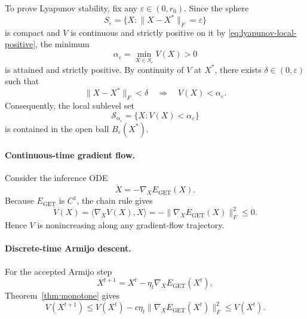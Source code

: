 \documentclass[11pt,a4paper]{article}
\begin{document}
To prove Lyapunov stability, fix any $\varepsilon\in(0,r_0)$. Since the
sphere
\begin{equation}
  S_\varepsilon = \{X : \|X-X^*\|_F = \varepsilon\}
\end{equation}
is compact and $V$ is continuous and strictly positive on it by
\eqref{eq:lyapunov-local-positive}, the minimum
\begin{equation}
  \alpha_\varepsilon
  = \min_{X\in S_\varepsilon} V(X)
  > 0
  \label{eq:lyapunov-alpha}
\end{equation}
is attained and strictly positive. By continuity of $V$ at $X^*$, there
exists $\delta\in(0,\varepsilon)$ such that
\begin{equation}
  \|X-X^*\|_F < \delta
  \quad\Longrightarrow\quad
  V(X) < \alpha_\varepsilon.
  \label{eq:lyapunov-delta}
\end{equation}
Consequently, the local sublevel set
\begin{equation}
  \mathcal{S}_{\alpha_\varepsilon}
  = \{X : V(X) < \alpha_\varepsilon\}
  \label{eq:lyapunov-sublevel}
\end{equation}
is contained in the open ball $B_\varepsilon(X^*)$.

\paragraph{Continuous-time gradient flow.}
Consider the inference ODE
\begin{equation}
  \dot X = -\nabla_X E_{\mathrm{GET}}(X).
\end{equation}
Because $E_{\mathrm{GET}}$ is $C^1$, the chain rule gives
\begin{equation}
  \dot V(X)
  = \bigl\langle \nabla_X V(X), \dot X \bigr\rangle
  = -\|\nabla_X E_{\mathrm{GET}}(X)\|_F^2
  \le 0.
  \label{eq:lyapunov-flow-decay}
\end{equation}
Hence $V$ is nonincreasing along any gradient-flow trajectory.

\paragraph{Discrete-time Armijo descent.}
For the accepted Armijo step
\begin{equation}
  X^{t+1} = X^t - \eta_t\nabla_X E_{\mathrm{GET}}(X^t),
\end{equation}
Theorem~\ref{thm:monotone} gives
\begin{equation}
  V(X^{t+1})
  \le V(X^t) - c\eta_t\|\nabla_X E_{\mathrm{GET}}(X^t)\|_F^2
  \le V(X^t).
  \label{eq:lyapunov-armijo-decay}
\end{equation}
\end{document}

